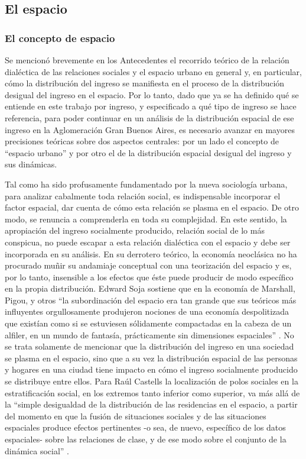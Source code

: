 	
	
	
	
	
	\subsection{El espacio}\label{MT-Espacio}
	
	\subsubsection{El concepto de espacio}
	
	Se mencionó brevemente en los Antecedentes el recorrido teórico de la relación dialéctica de  las relaciones sociales y el espacio urbano en general y, en particular, cómo la distribución del ingreso se manifiesta en el proceso de la distribución desigual del ingreso en el espacio. Por lo tanto, dado que ya se ha definido qué se entiende en este trabajo por ingreso, y especificado a qué tipo de ingreso se hace referencia, para poder continuar en un análisis de la distribución espacial de ese ingreso en la Aglomeración Gran Buenos Aires, es necesario avanzar en mayores precisiones teóricas sobre dos aspectos centrales: por un lado el concepto de “espacio urbano” y por otro el de la distribución espacial desigual del ingreso y sus dinámicas.
	
	Tal como ha sido profusamente fundamentado por la nueva sociología urbana, para analizar cabalmente toda relación social, es indispensable incorporar el factor espacial, dar cuenta de cómo esta relación se plasma en el espacio. De otro modo, se renuncia a comprenderla en toda su complejidad. En este sentido, la apropiación del ingreso socialmente producido, relación social de lo más conspicua, no puede escapar a esta relación dialéctica con el espacio y debe ser incorporada en su análisis. En su derrotero teórico, la economía neoclásica no ha procurado muñir su andamiaje conceptual con una teorización del espacio y es, por lo tanto, insensible a los efectos que éste puede producir de modo específico en la propia distribución. Edward Soja sostiene que en la economía de Marshall, Pigou, y otros “la subordinación del espacio era tan grande que sus teóricos más influyentes orgullosamente produjeron nociones de una economía despolitizada que existían como si se estuviesen sólidamente compactadas en la cabeza de un alfiler, en un mundo de fantasía, prácticamente sin dimensiones espaciales” \cite[p.~32]{soja}. No se trata solamente de mencionar que la distribución del ingreso en una sociedad se plasma en el espacio, sino que a su vez la distribución espacial de las personas y hogares en una ciudad tiene impacto en cómo el ingreso socialmente producido se distribuye entre ellos. Para Raúl Castells la localización de polos sociales en la estratificación social, en los extremos tanto inferior como superior, va más allá de la “simple desigualdad de la distribución de las residencias en el espacio, a partir del momento en que la fusión de situaciones sociales y de las situaciones espaciales produce efectos pertinentes -o sea, de nuevo, específico de los datos espaciales- sobre las relaciones de clase, y de ese modo sobre el conjunto de la dinámica social” \cite[p.~213]{castells}.
	
